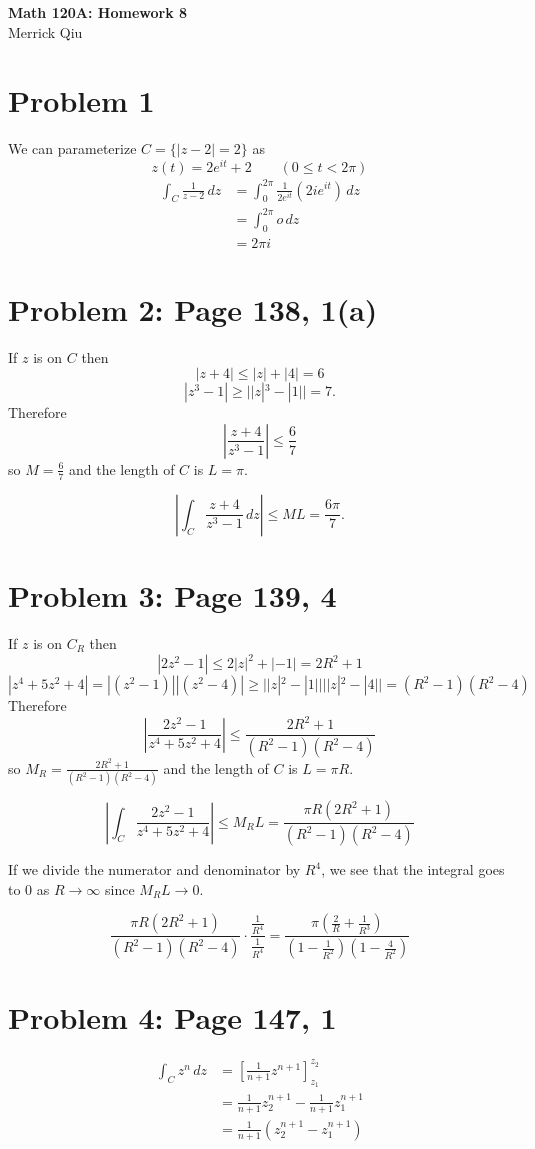 \documentclass{article}
\begin{document}
\begin{center}
	\huge{\bf Math 120A: Homework 8} \\
	Merrick Qiu
\end{center}
\section*{Problem 1}
We can parameterize $C = \{|z-2| = 2\}$ as 
\[
	z(t) = 2e^{it} + 2 \qquad (0 \leq t < 2\pi)
\]
\begin{align*}
	\int_C \frac{1}{z-2} \,dz 
	&= \int_0^{2\pi} \frac{1}{2e^{it}} \left(2ie^{it}\right) \,dz  \\
	&= \int_0^{2\pi} o \,dz  \\
	&= 2\pi i
\end{align*}
\newpage 

\section*{Problem 2: Page 138, 1(a)}
If $z$ is on $C$ then 
\[
	|z+4| \leq |z| + |4| = 6
\]
\[
	|z^3-1| \geq ||z|^3-|1|| = 7.
\]
Therefore 
\[
	\left|\frac{z+4}{z^3-1}\right| \leq \frac{6}{7}
\]
so $M = \frac{6}{7}$ and the length of $C$ is 
$L=\pi$.

\[
	\left|\int_C \frac{z+4}{z^3-1} \,dz\right|
	\leq ML = \frac{6\pi}{7}.
\]
\newpage

\section*{Problem 3: Page 139, 4}
If $z$ is on $C_R$ then 
\[
	|2z^2-1| \leq 2|z|^2 + |-1| = 2R^2+1
\]
\[
	|z^4 + 5z^2 + 4| = 
	|(z^2-1)||(z^2-4)| \geq
	||z|^2 - |1||||z|^2 - |4|| =
	(R^2-1)(R^2-4)
\]
Therefore
\[
	\left|\frac{2z^2-1}{z^4 + 5z^2 + 4}\right| \leq \frac{2R^2+1}{(R^2-1)(R^2-4)}
\]
so $M_R = \frac{2R^2+1}{(R^2-1)(R^2-4)}$ and the length of $C$ is 
$L = \pi R$.

\[
	\left|\int_C \frac{2z^2-1}{z^4 + 5z^2 + 4}\right| \leq M_RL = 
	\frac{\pi R(2R^2+1)}{(R^2-1)(R^2-4)}
\]

If we divide the numerator and denominator by $R^4$,
we see that the integral goes to $0$ as $R \to \infty$ since $M_RL \to 0$.

\[
	\frac{\pi R(2R^2+1)}{(R^2-1)(R^2-4)}
	\cdot \frac{\frac{1}{R^4}}{\frac{1}{R^4}}
	=
	\frac{\pi (\frac{2}{R}+\frac{1}{R^3})}{(1-\frac{1}{R^2})(1-\frac{4}{R^2})}
\]
\newpage 
\section*{Problem 4: Page 147, 1}
\begin{align*}
	\int_C z^n \,dz &=
	\left[\frac{1}{n+1}z^{n+1}\right]_{z_1}^{z_2} \\
	&= \frac{1}{n+1}z_2^{n+1} - \frac{1}{n+1}z_1^{n+1} \\
	&= \frac{1}{n+1}(z_2^{n+1} - z_1^{n+1})
\end{align*}
\newpage
\end{document}
